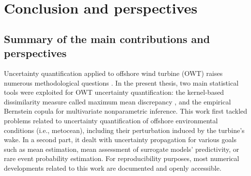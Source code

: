 \chapter*{Conclusion and perspectives}


\section*{Summary of the main contributions and perspectives}
Uncertainty quantification applied to offshore wind turbine (OWT) raises numerous methodological questions \citep{veers_2019_review}. 
In the present thesis, two main statistical tools were exploited for OWT uncertainty quantification: the kernel-based dissimilarity measure called maximum mean discrepancy \citep{gretton_2006}, and the empirical Bernstein copula \citep{sancetta_satchell_2004} for multivariate nonparametric inference. 
This work first tackled problems related to uncertainty quantification of offshore environmental conditions (i.e., metocean), including their perturbation induced by the turbine's wake. 
In a second part, it dealt with uncertainty propagation for various goals such as mean estimation, mean assessment of surrogate models' predictivity, or rare event probability estimation.
For reproducibility purposes, most numerical developments related to this work are documented and openly accessible. 


